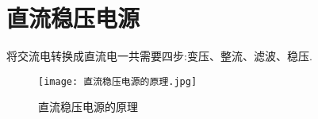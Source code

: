 \chapter{直流稳压电源}
\Par 将交流电转换成直流电一共需要四步:变压、整流、滤波、稳压.
\begin{figure}[htbp]
	\centering
	\texttt{[image: 直流稳压电源的原理.jpg]}
	\caption{直流稳压电源的原理}
	\label{fig:直流稳压电源的原理}
\end{figure}







